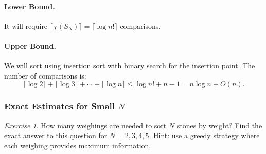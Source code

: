 \documentclass[12pt,sans]{article}
\theoremstyle{definition}
\theoremstyle{plain}
\theoremstyle{remark}
\newtheorem{exercise}{Exercise}[section]
\begin{document}
\paragraph{Lower Bound.} It will require \(\lceil\chi(S_N)\rceil = \lceil\log n!\rceil\) comparisons.

\paragraph{Upper Bound.} We will sort using insertion sort with binary search for the insertion point. The number of comparisons is:
\[
\lceil\log 2\rceil + \lceil\log 3\rceil + \dotsb + \lceil\log n\rceil \le \log n! + n - 1 = n\log n + O(n).
\]

\subsubsection{Exact Estimates for Small \(N\)}
\begin{exercise}
    How many weighings are needed to sort \(N\) stones by weight?
    Find the exact answer to this question for \(N = 2, 3, 4, 5\). Hint: use a greedy strategy where each weighing provides maximum information.
\end{exercise}
\end{document}
